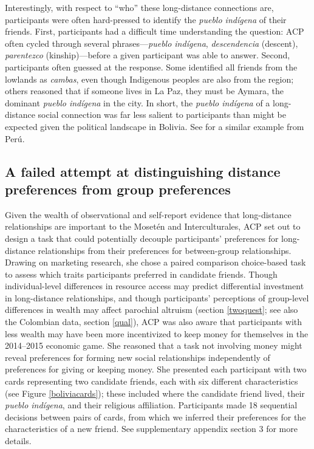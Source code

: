 \documentclass[bibauthoryear]{aa}
\begin{document}
	Interestingly, with respect to ``who'' these long-distance connections are, participants were often hard-pressed to identify the \textit{pueblo ind\'igena} of their friends. First, participants had a difficult time understanding the question: ACP often cycled through several phrases---\textit{pueblo ind\'igena}, \textit{descendencia} (descent), \textit{parentezco} (kinship)---before a given participant was able to answer. Second, participants often guessed at the response. Some identified all friends from the lowlands as \textit{cambas}, even though Indigenous peoples are also from the region; others reasoned that if someone lives in La Paz, they must be Aymara, the dominant \textit{pueblo ind\'igena} in the city. In short, the \textit{pueblo ind\'igena} of a long-distance social connection was far less salient to participants than might be expected given the political landscape in Bolivia. See \citet{moya2015different} for a similar example from Per\'u.

\subsection{A failed attempt at distinguishing distance preferences from group preferences}

Given the wealth of observational and self-report evidence that long-distance relationships are important to the Moset\'en and Interculturales, ACP set out to design a task that could potentially decouple participants' preferences for long-distance relationships from their preferences for between-group relationships. Drawing on marketing research, she chose a paired comparison choice-based task \citep{rao2014applied} to assess which traits participants preferred in candidate friends. Though individual-level differences in resource access may predict differential investment in long-distance relationships, and though participants' perceptions of group-level differences in wealth may affect parochial altruism (section \ref{twoquest}; see also the Colombian data, section \ref{qual}), ACP was also aware that participants with less wealth may have been more incentivized to keep money for themselves in the 2014--2015 economic game. She reasoned that a task not involving money might reveal preferences for forming new social relationships independently of preferences for giving or keeping money. She presented each participant with two cards representing two candidate friends, each with six different characteristics (see Figure \ref{boliviacards}); these included where the candidate friend lived, their \textit{pueblo ind\'igena}, and their religious affiliation. Participants made 18 sequential decisions between pairs of cards, from which we inferred their preferences for the characteristics of a new friend. See supplementary appendix section 3 for more details.
\end{document}
